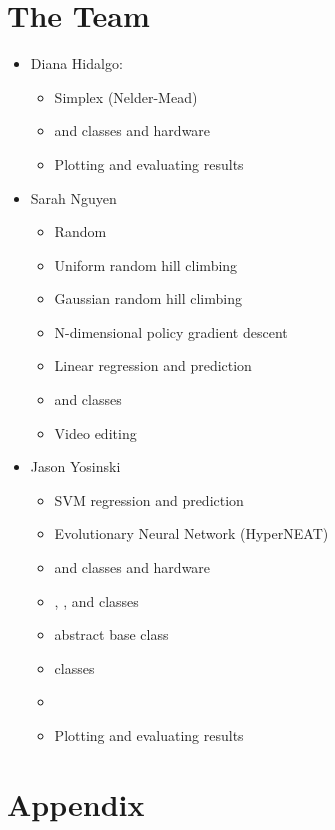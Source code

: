 \section{The Team}
\begin{itemize}
\item Diana Hidalgo: 
\begin{itemize}
\item Simplex (Nelder-Mead)
\item {} and  classes and hardware
\item Plotting and evaluating results
\end{itemize}
\item Sarah Nguyen
\begin{itemize}
\item Random
\item Uniform random hill climbing
\item Gaussian random hill climbing
\item N-dimensional policy gradient descent
\item Linear regression and prediction
\item {} and  classes
\item Video editing
\end{itemize}
\item Jason Yosinski
\begin{itemize}
\item SVM regression and prediction
\item Evolutionary Neural Network (HyperNEAT)
\item {} and  classes and hardware
\item {}, , and  classes
\item {} abstract base class
\item {} classes
\item {}
\item Plotting and evaluating results
\end{itemize}
\end{itemize}

\section{Appendix}


